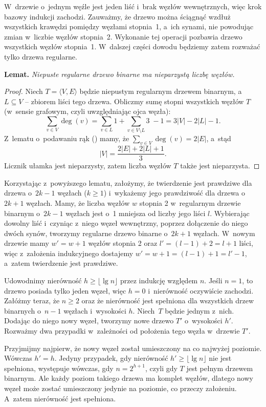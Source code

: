 \exercise %
W~drzewie o~jednym węźle jest jeden liść i~brak węzłów wewnętrznych, więc krok bazowy indukcji zachodzi.
Zauważmy, że drzewo można ściągnąć wzdłuż wszystkich krawędzi pomiędzy węzłami stopnia~1, a~ich synami, nie powodując zmian w~liczbie węzłów stopnia~2.
Wykonanie tej operacji pozbawia drzewo wszystkich węzłów stopnia~1.
W~dalszej części dowodu będziemy zatem rozważać tylko drzewa regularne.

\medskip
\noindent\textsf{\textbf{Lemat.}} \textit{Niepuste regularne drzewo binarne ma nieparzystą liczbę węzłów.}
\begin{proof}
Niech $T=\langle V,E\rangle$ będzie niepustym regularnym drzewem binarnym, a~$L\subseteq V$ -- zbiorem liści tego drzewa.
Obliczmy sumę stopni wszystkich węzłów $T$ (w~sensie grafowym, czyli uwzględniając ojca węzła):
\[
	\sum_{v\in V}\deg(v) = \sum_{v\in L}1+\sum_{v\in V\setminus L}\!\!\!3\;-1=3|V|-2|L|-1.
\]
Z~lematu o~podawaniu rąk () mamy, że $\sum_{v\in V}\deg(v) = 2|E|$, a~stąd
\[
	|V| = \frac{2|E|+2|L|+1}{3}.
\]
Licznik ułamka jest nieparzysty, zatem liczba węzłów $T$ także jest nieparzysta.
\end{proof}

Korzystając z~powyższego lematu, założymy, że twierdzenie jest prawdziwe dla drzewa o~$2k-1$ węzłach ($k\ge1$) i~wykażemy jego prawdziwość dla drzewa o~$2k+1$ węzłach.
Mamy, że liczba węzłów $w$ stopnia 2 w~regularnym drzewie binarnym o~$2k-1$ węzłach jest o~1 mniejsza od liczby jego liści $l$.
Wybierając dowolny liść i~czyniąc z~niego węzeł wewnętrzny, poprzez dołączenie do niego dwóch synów, tworzymy regularne drzewo binarne o~$2k+1$ węzłach.
W~nowym drzewie mamy $w'=w+1$ węzłów stopnia 2 oraz $l'=(l-1)+2=l+1$ liści, więc z~założenia indukcyjnego dostajemy $w'=w+1=(l-1)+1=l'-1$, a~zatem twierdzenie jest prawdziwe.

\exercise %
Udowodnimy nierówność $h\ge\lfloor\lg n\rfloor$ przez indukcję względem $n$.
Jeśli $n=1$, to drzewo posiada tylko jeden węzeł, więc $h=0$ i~nierówność oczywiście zachodzi.
Załóżmy teraz, że $n\ge2$ oraz że nierówność jest spełniona dla wszystkich drzew binarnych o~$n-1$ węzłach i~wysokości $h$.
Niech~$T$ będzie jednym z~nich.
Dodając do niego nowy węzeł, tworzymy nowe drzewo $T'$ o~wysokości $h'$.
Rozważmy dwa przypadki w~zależności od położenia tego węzła w~drzewie $T'$.

Przyjmijmy najpierw, że nowy węzeł został umieszczony na co najwyżej  poziomie.
Wówczas $h'=h$.
Jedyny przypadek, gdy nierówność $h'\ge\lfloor\lg n\rfloor$ nie jest spełniona, występuje wówczas, gdy $n=2^{h+1}$, czyli gdy $T$ jest pełnym drzewem binarnym.
Ale każdy poziom takiego drzewa ma komplet węzłów, dlatego nowy węzeł może zostać umieszczony jedynie na  poziomie, co przeczy założeniu.
A~zatem nierówność jest spełniona.

